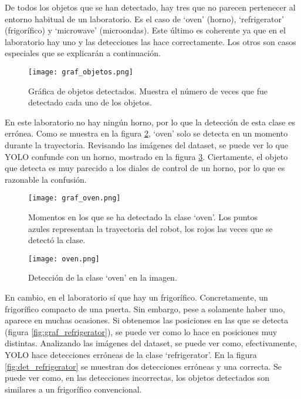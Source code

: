 De todos los objetos que se han detectado, hay tres que no parecen pertenecer al entorno habitual de un laboratorio. Es el caso de `oven' (horno), `refrigerator' (frigorífico) y `microwave' (microondas). Este último es coherente ya que en el laboratorio hay uno y las detecciones las hace correctamente. Los otros son casos especiales que se explicarán a continuación.\\

\begin{figure}[h]
	\begin{center} 
		\texttt{[image: graf\_objetos.png]}
	\end{center}
	\caption{Gráfica de objetos detectados. Muestra el número de veces que fue detectado cada uno de los objetos.}
	\label{fig:graf_objetos}
\end{figure}

En este laboratorio no hay ningún horno, por lo que la detección de esta clase es errónea. Como se muestra en la figura \ref{fig:graf_oven}, `oven' solo se detecta en un momento durante la trayectoria. Revisando las imágenes del dataset, se puede ver lo que YOLO confunde con un horno, mostrado en la figura \ref{fig:det_oven}. Ciertamente, el objeto que detecta es muy parecido a los diales de control de un horno, por lo que es razonable la confusión.\\

\begin{figure}[h]
	\begin{center} 
		\texttt{[image: graf\_oven.png]}
	\end{center}
	\caption{Momentos en los que se ha detectado la clase `oven'. Los puntos azules representan la trayectoria del robot, los rojos las veces que se detectó la clase.}
	\label{fig:graf_oven}
\end{figure}

\begin{figure}[h]
	\begin{center} 
		\texttt{[image: oven.png]}
	\end{center}
	\caption{Detección de la clase `oven' en la imagen.}
	\label{fig:det_oven}
\end{figure}

En cambio, en el laboratorio sí que hay un frigorífico. Concretamente, un frigorífico compacto de una puerta. Sin embargo, pese a solamente haber uno, aparece en muchas ocasiones. Si obtenemos las posiciones en las que se detecta (figura \ref{fig:graf_refrigerator}), se puede ver como lo hace en posiciones muy distintas. Analizando las imágenes del dataset, se puede ver como, efectivamente, YOLO hace detecciones erróneas de la clase `refrigerator'. En la figura \ref{fig:det_refrigerator} se muestran dos detecciones erróneas y una correcta. Se puede ver como, en las detecciones incorrectas, los objetos detectados son similares a un frigorífico convencional.\\

